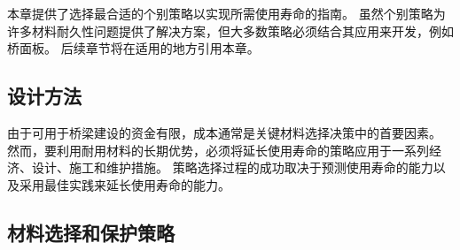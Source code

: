 本章提供了选择最合适的个别策略以实现所需使用寿命的指南。 虽然个别策略为许多材料耐久性问题提供了解决方案，但大多数策略必须结合其应用来开发，例如桥面板。 后续章节将在适用的地方引用本章。

\subsection{设计方法}
由于可用于桥梁建设的资金有限，成本通常是关键材料选择决策中的首要因素。 然而，要利用耐用材料的长期优势，必须将延长使用寿命的策略应用于一系列经济、设计、施工和维护措施。 策略选择过程的成功取决于预测使用寿命的能力以及采用最佳实践来延长使用寿命的能力。

\subsection{材料选择和保护策略}

